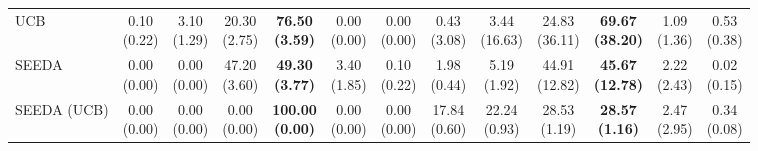 \begin{table}[H]
{\begin{tabular}{l|cccccc|cccccc}
UCB & \makecell{0.10 \\ (0.22)} & \makecell{3.10 \\ (1.29)} & {\cellcolor[HTML]{C8E6C9}} \makecell{20.30 \\ (2.75)} & \bfseries \makecell{76.50 \\ (3.59)} & \makecell{0.00 \\ (0.00)} & \makecell{0.00 \\ (0.00)} & \makecell{0.43 \\ (3.08)} & \makecell{3.44 \\ (16.63)} & {\cellcolor[HTML]{C8E6C9}} \makecell{24.83 \\ (36.11)} & \bfseries \makecell{69.67 \\ (38.20)} & \makecell{1.09 \\ (1.36)} & \makecell{0.53 \\ (0.38)} \\
SEEDA & \makecell{0.00 \\ (0.00)} & \makecell{0.00 \\ (0.00)} & {\cellcolor[HTML]{C8E6C9}} \makecell{47.20 \\ (3.60)} & \bfseries \makecell{49.30 \\ (3.77)} & \makecell{3.40 \\ (1.85)} & \makecell{0.10 \\ (0.22)} & \makecell{1.98 \\ (0.44)} & \makecell{5.19 \\ (1.92)} & {\cellcolor[HTML]{C8E6C9}} \makecell{44.91 \\ (12.82)} & \bfseries \makecell{45.67 \\ (12.78)} & \makecell{2.22 \\ (2.43)} & \makecell{0.02 \\ (0.15)} \\
SEEDA (UCB) & \makecell{0.00 \\ (0.00)} & \makecell{0.00 \\ (0.00)} & {\cellcolor[HTML]{C8E6C9}} \makecell{0.00 \\ (0.00)} & \bfseries \makecell{100.00 \\ (0.00)} & \makecell{0.00 \\ (0.00)} & \makecell{0.00 \\ (0.00)} & \makecell{17.84 \\ (0.60)} & \makecell{22.24 \\ (0.93)} & {\cellcolor[HTML]{C8E6C9}} \makecell{28.53 \\ (1.19)} & \bfseries \makecell{28.57 \\ (1.16)} & \makecell{2.47 \\ (2.95)} & \makecell{0.34 \\ (0.08)} \\

\end{tabular}}
\end{table}
